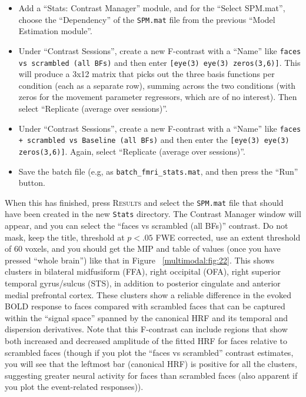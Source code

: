 \begin{itemize}
\item Add a ``Stats: Contrast Manager'' module, and for the ``Select SPM.mat'', choose the ``Dependency'' of the \texttt{SPM.mat} file from the previous ``Model Estimation module''.

\item Under ``Contrast Sessions'', create a new F-contrast with a ``Name'' like \texttt{faces vs scrambled (all BFs)} and then enter  \texttt{[eye(3) eye(3) zeros(3,6)]}. This will produce a 3x12 matrix that picks out the three basis functions per condition (each as a separate row), summing across the two conditions (with zeros for the movement parameter regressors, which are of no interest). Then select ``Replicate (average over sessions)''.

\item Under ``Contrast Sessions'', create a new F-contrast with a ``Name'' like \texttt{faces + scrambled vs Baseline (all BFs)} and then enter the \matlab \texttt{[eye(3) eye(3) zeros(3,6)]}. Again, select ``Replicate (average over sessions)''.

\item Save the batch file (e.g, as \texttt{batch\_fmri\_stats.mat}, and then press the ``Run'' button.

\end{itemize}

When this has finished, press \textsc{Results} and select the \texttt{SPM.mat} file that should have been created in the new \texttt{Stats} directory. The Contrast Manager window will appear, and you can select the ``faces vs scrambled (all BFs)'' contrast. Do not mask, keep the title, threshold at $p<.05$ FWE corrected, use an extent threshold of 60 voxels, and you should get the MIP and table of values (once you have pressed ``whole brain'') like that in Figure ~\ref{multimodal:fig:22}. This shows clusters in bilateral midfusiform (FFA), right occipital (OFA), right superior temporal gyrus/sulcus (STS), in addition to posterior cingulate and anterior medial prefrontal cortex. These clusters show a reliable difference in the evoked BOLD response to faces compared with scrambled faces that can be captured within the ``signal space'' spanned by the canonical HRF and its temporal and dispersion derivatives. Note that this F-contrast can include regions that show both increased and decreased amplitude of the fitted HRF for faces relative to scrambled faces (though if you plot the ``faces vs scrambled'' contrast estimates, you will see that the leftmost bar (canonical HRF) is positive for all the clusters, suggesting greater neural activity for faces than scrambled faces (also apparent if you plot the event-related responses)).

